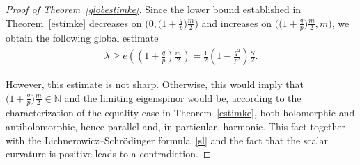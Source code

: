 \documentclass[10pt,a4paper]{amsart}
\numberwithin{equation}{section}
\theoremstyle{definition}
\begin{document}
\begin{proof}[Proof of Theorem~\ref{globestimke}]
\hspace{0.01cm} Since the lower bound established in Theorem~\ref{estimke} decreases on $\big(0,\big(1+\frac{q}{p}\big)\frac{m}{2}\big)$ and increases on $\big(\big(1+\frac{q}{p}\big)\frac{m}{2},m\big)$, we obtain the following global estimate
\begin{gather*}\lambda\geq e\left(\left(1+\frac{q}{p}\right)\frac{m}{2}\right)=\frac{1}{2}\left(1-\frac{q^2}{p^2}\right)\frac{S}{2}.\end{gather*}

However, this estimate is not sharp. Otherwise, this would imply that $\big(1+\frac{q}{p}\big)\frac{m}{2}\in\mathbb{N}$ and the limiting eigenspinor would be, according to the characterization of the equality case in Theo\-rem~\ref{estimke}, both holomorphic and antiholomorphic, hence parallel and, in particular, harmonic. This fact together with the Lichnerowicz--Schr\"odinger formula~\eqref{sl} and the fact that the scalar curvature is positive leads to a contradiction.


\end{proof}
\end{document}
